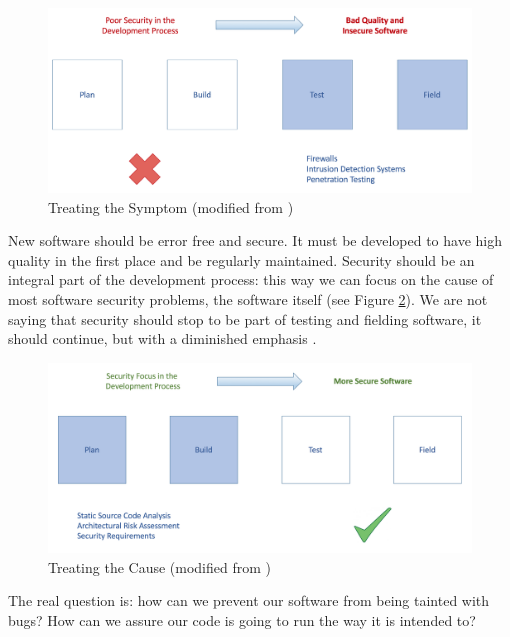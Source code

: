 \begin{figure}[ht]
  \centering
  \includegraphics[scale=0.41]{figures/treating-the-symptom}
  \caption{Treating the Symptom (modified from \cite{chess2007secure})}
  \label{fig:treating-the-symptom}
\end{figure}

New software should be error free and secure. It must be developed to have high quality in the first place and be regularly maintained. Security should be an integral part of the development process: this way we can focus on the cause of most software security problems, the software itself (see Figure \ref{fig:treating-the-cause}). We are not saying that security should stop to be part of testing and fielding software, it should continue, but with a diminished emphasis \cite{chess2007secure}.

\begin{figure}[ht]
  \centering
  \includegraphics[scale=0.41]{figures/treating-the-cause}
  \caption{Treating the Cause (modified from \cite{chess2007secure})}
  \label{fig:treating-the-cause}
\end{figure}

The real question is: how can we prevent our software from being tainted with bugs? How can we assure our code is going to run the way it is intended to?

\clearpage

